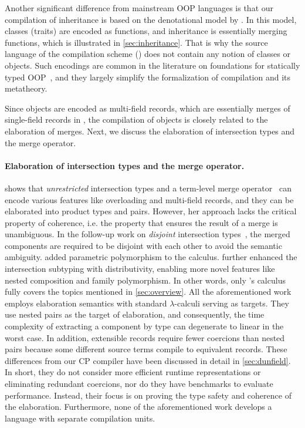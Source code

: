 Another significant difference from mainstream OOP languages is that our
compilation of inheritance is based on the denotational model by
\citet{cook1989denotational}. In this model, classes (traits) are encoded as
functions, and inheritance is essentially merging functions, which is
illustrated in \autoref{sec:inheritance}. That is why the source language of the
compilation scheme (\lambdaiplus) does not contain any notion of classes or
objects. Such encodings are common in the literature on foundations for
statically typed
OOP~\citep{bruce1999comparing,bruce2002foundations,pierce2002types}, and they
largely simplify the formalization of compilation and its metatheory.

Since objects are encoded as multi-field records, which are essentially merges
of single-field records in \lambdaiplus, the compilation of objects is closely
related to the elaboration of merges. Next, we discuss the elaboration of
intersection types and the merge operator.

\paragraph{Elaboration of intersection types and the merge operator.}
\citet{dunfield2014elaborating} shows that \emph{unrestricted} intersection
types and a term-level merge operator~\citep{reynolds1997design} can encode
various features like overloading and multi-field records, and they can be
elaborated into product types and pairs. However, her approach lacks the
critical property of coherence, i.e. the property that ensures the result of a
merge is unambiguous. In the follow-up work on \emph{disjoint} intersection
types~\citep{oliveira2016disjoint}, the merged components are required to be
disjoint with each other to avoid the semantic ambiguity.
\citet{alpuim2017disjoint} added parametric polymorphism to the calculus.
\citet{bi2018essence,bi2019distributive} further enhanced the intersection
subtyping with distributivity, enabling more novel features like nested
composition and family polymorphism. In other words, only
\citeauthor{bi2019distributive}'s \fiplus calculus fully covers the topics
mentioned in \autoref{sec:overview}. All the aforementioned work employs
elaboration semantics with standard $\lambda$-calculi serving as targets. They
use nested pairs as the target of elaboration, and consequently, the time
complexity of extracting a component by type can degenerate to linear in the
worst case. In addition, extensible records require fewer coercions than nested
pairs because some different source terms compile to equivalent records. These
differences from our CP compiler have been discussed in detail in
\autoref{sec:dunfield}. In short, they do not consider more efficient runtime
representations or eliminating redundant coercions, nor do they have benchmarks
to evaluate performance. Instead, their focus is on proving the type safety and
coherence of the elaboration. Furthermore, none of the aforementioned work
develops a language with separate compilation units.


